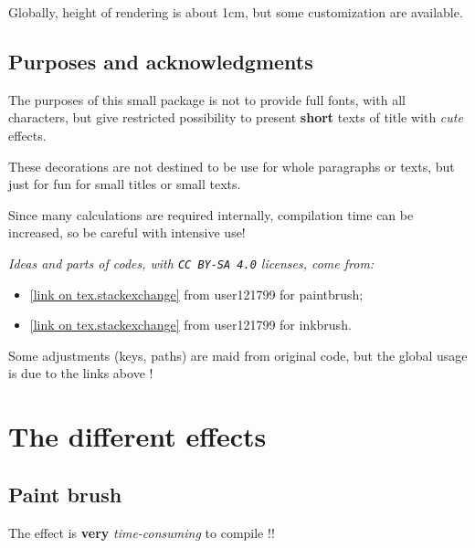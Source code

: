 \documentclass[11pt,a4paper]{ltxdoc}
\begin{document}
\smallskip

Globally, height of rendering is about 1cm, but some customization are available.

\subsection{Purposes and acknowledgments}

The purposes of this small package is not to provide full fonts, with all characters, but give restricted possibility to present \textbf{short} texts of title with \textit{cute} effects.

\smallskip

These decorations are not destined to be use for whole paragraphs or texts, but just for fun for small titles or small texts.

\smallskip

Since many calculations are required internally, compilation time can be increased, so be careful with intensive use!

\smallskip

\textit{Ideas and parts of codes, with \texttt{CC\,BY-SA\,4.0} licenses, come from:}

\begin{itemize}
	\item \href{https://tex.stackexchange.com/questions/475141/simulating-paintbrush-strokes-in-tikz}{[link on tex.stackexchange]} from \textsf{user121799} for paintbrush;
	\item \href{https://tex.stackexchange.com/questions/460836/custom-line-cap-to-simulate-inked-line-in-tikz/460842#460842}{[link on tex.stackexchange]} from \textsf{user121799} for inkbrush.
\end{itemize}

Some adjustments (keys, paths) are maid from original code, but the global usage is due to the links above !

\pagebreak

\section{The different effects}

\subsection{Paint brush}

{\small\faBomb} The effect is \textbf{very} \textit{time-consuming} to compile !!
\end{document}
